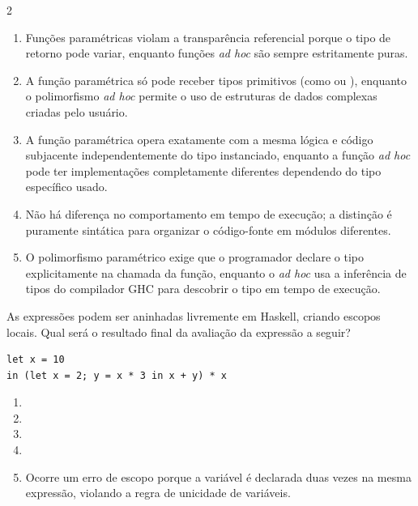 \documentclass[a4paper,10pt,brazil]{article}
\begin{document}
\begin{multicols}{2}
\begin{enumerate}
  \item Funções paramétricas violam a transparência referencial porque o tipo de retorno pode variar, enquanto funções \emph{ad hoc} são sempre estritamente puras.

  \item A função paramétrica só pode receber tipos primitivos (como  ou ), enquanto o polimorfismo \emph{ad hoc} permite o uso de estruturas de dados complexas criadas pelo usuário.

  \item A função paramétrica opera exatamente com a mesma lógica e código subjacente independentemente do tipo instanciado, enquanto a função \emph{ad hoc} pode ter implementações completamente diferentes dependendo do tipo específico usado.

  \item Não há diferença no comportamento em tempo de execução; a distinção é puramente sintática para organizar o código-fonte em módulos diferentes.

  \item O polimorfismo paramétrico exige que o programador declare o tipo explicitamente na chamada da função, enquanto o \emph{ad hoc} usa a inferência de tipos do compilador GHC para descobrir o tipo em tempo de execução.


\end{enumerate}

As expressões  podem ser aninhadas livremente em Haskell, criando escopos locais. Qual será o resultado final da avaliação da expressão a seguir?
\begin{verbatim}
let x = 10 
in (let x = 2; y = x * 3 in x + y) * x
\end{verbatim}

\begin{enumerate}
  \item {}

  \item {}

  \item {}

  \item {}

  \item Ocorre um erro de escopo porque a variável  é declarada duas vezes na mesma expressão, violando a regra de unicidade de variáveis.



\end{enumerate}
\end{multicols}
\end{document}
